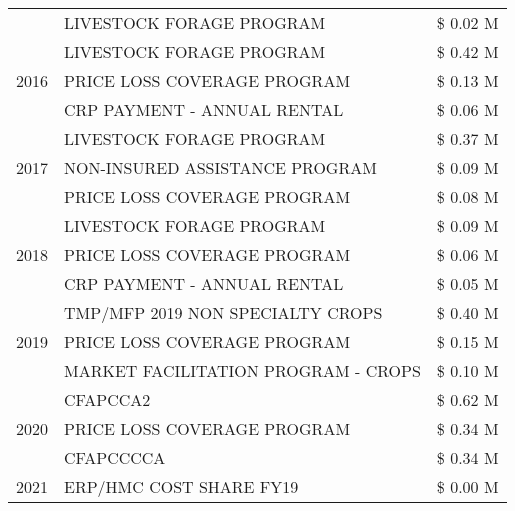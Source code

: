 \begin{tabular}{llr}
 & LIVESTOCK FORAGE PROGRAM & \$ 0.02 M \\
\cline{1-3}
\multirow[t]{3}{*}{2016} & LIVESTOCK FORAGE PROGRAM                      & \$ 0.42 M \\
 & PRICE LOSS COVERAGE PROGRAM                   & \$ 0.13 M \\
 & CRP PAYMENT - ANNUAL RENTAL                   & \$ 0.06 M \\
\cline{1-3}
\multirow[t]{3}{*}{2017} & LIVESTOCK FORAGE PROGRAM & \$ 0.37 M \\
 & NON-INSURED ASSISTANCE PROGRAM & \$ 0.09 M \\
 & PRICE LOSS COVERAGE PROGRAM & \$ 0.08 M \\
\cline{1-3}
\multirow[t]{3}{*}{2018} & LIVESTOCK FORAGE PROGRAM & \$ 0.09 M \\
 & PRICE LOSS COVERAGE PROGRAM & \$ 0.06 M \\
 & CRP PAYMENT - ANNUAL RENTAL & \$ 0.05 M \\
\cline{1-3}
\multirow[t]{3}{*}{2019} & TMP/MFP 2019 NON SPECIALTY CROPS & \$ 0.40 M \\
 & PRICE LOSS COVERAGE PROGRAM & \$ 0.15 M \\
 & MARKET FACILITATION PROGRAM - CROPS & \$ 0.10 M \\
\cline{1-3}
\multirow[t]{3}{*}{2020} & CFAPCCA2 & \$ 0.62 M \\
 & PRICE LOSS COVERAGE PROGRAM & \$ 0.34 M \\
 & CFAPCCCCA & \$ 0.34 M \\
\cline{1-3}
2021 & ERP/HMC COST SHARE FY19 & \$ 0.00 M \\
\cline{1-3}
\bottomrule
\end{tabular}
